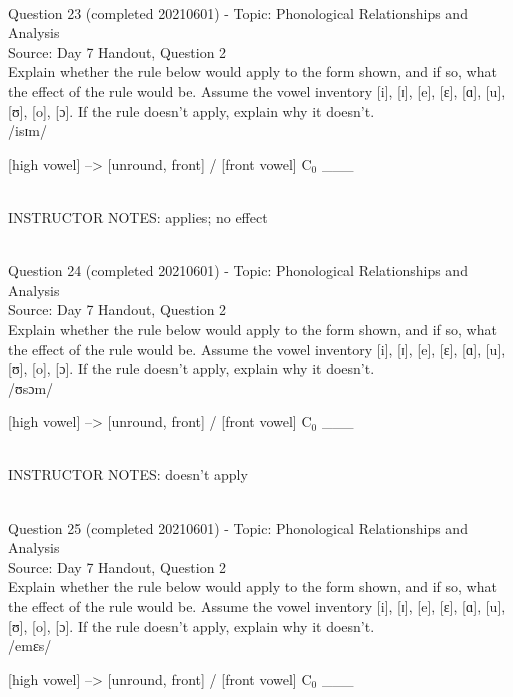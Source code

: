 \documentclass[12pt]{article}
\begin{document}
~\\

{\large Question 23} (completed 20210601) - Topic: Phonological Relationships and Analysis\\
Source: Day 7 Handout, Question 2\\

Explain whether the rule below would apply to the form shown, and if so, what the effect of the rule would be. Assume the vowel inventory [i], [ɪ], [e], [ɛ], [ɑ], [u], [ʊ], [o], [ɔ]. If the rule doesn't apply, explain why it doesn't.\\

/isɪm/

{[high vowel]} --> {[unround, front]} / {[front vowel]} C$_0$ ___


~\\
INSTRUCTOR NOTES: applies; no effect


~\\

{\large Question 24} (completed 20210601) - Topic: Phonological Relationships and Analysis\\
Source: Day 7 Handout, Question 2\\

Explain whether the rule below would apply to the form shown, and if so, what the effect of the rule would be. Assume the vowel inventory [i], [ɪ], [e], [ɛ], [ɑ], [u], [ʊ], [o], [ɔ]. If the rule doesn't apply, explain why it doesn't.\\

/ʊsɔm/

{[high vowel]} --> {[unround, front]} / {[front vowel]} C$_0$ ___


~\\
INSTRUCTOR NOTES: doesn't apply


~\\

{\large Question 25} (completed 20210601) - Topic: Phonological Relationships and Analysis\\
Source: Day 7 Handout, Question 2\\

Explain whether the rule below would apply to the form shown, and if so, what the effect of the rule would be. Assume the vowel inventory [i], [ɪ], [e], [ɛ], [ɑ], [u], [ʊ], [o], [ɔ]. If the rule doesn't apply, explain why it doesn't.\\

/emɛs/

{[high vowel]} --> {[unround, front]} / {[front vowel]} C$_0$ ___
\end{document}
